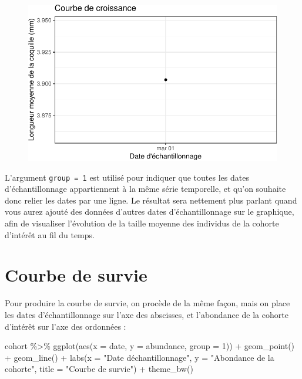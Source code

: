 \documentclass[
  a4paper,
  DIV=11,
  numbers=noendperiod,
  oneside]{scrreprt}
\newenvironment{Shaded}{}{}
\newcommand{\AttributeTok}[1]{\textcolor[rgb]{0.84,0.23,0.29}{#1}}
\newcommand{\DecValTok}[1]{\textcolor[rgb]{0.00,0.36,0.77}{#1}}
\newcommand{\FunctionTok}[1]{\textcolor[rgb]{0.44,0.26,0.76}{#1}}
\newcommand{\NormalTok}[1]{\textcolor[rgb]{0.14,0.16,0.18}{#1}}
\newcommand{\SpecialCharTok}[1]{\textcolor[rgb]{0.00,0.36,0.77}{#1}}
\newcommand{\StringTok}[1]{\textcolor[rgb]{0.01,0.18,0.38}{#1}}
\begin{document}
\begin{figure}


{\centering \includegraphics{04-Cohortes_files/figure-pdf/fig-croiss-1.pdf}

}

\end{figure}

L'argument \texttt{group\ =\ 1} est utilisé pour indiquer que toutes les
dates d'échantillonnage appartiennent à la même série temporelle, et
qu'on souhaite donc relier les dates par une ligne. Le résultat sera
nettement plus parlant quand vous aurez ajouté des données d'autres
dates d'échantillonnage sur le graphique, afin de visualiser l'évolution
de la taille moyenne des individus de la cohorte d'intérêt au fil du
temps.

\hypertarget{courbe-de-survie}{%
\section{Courbe de survie}\label{courbe-de-survie}}

Pour produire la courbe de survie, on procède de la même façon, mais on
place les dates d'échantillonnage sur l'axe des abscisses, et
l'abondance de la cohorte d'intérêt sur l'axe des ordonnées :

\begin{Shaded}
\begin{Highlighting}[]
\NormalTok{cohort }\SpecialCharTok{\%\textgreater{}\%}
  \FunctionTok{ggplot}\NormalTok{(}\FunctionTok{aes}\NormalTok{(}\AttributeTok{x =}\NormalTok{ date, }\AttributeTok{y =}\NormalTok{ abundance, }\AttributeTok{group =} \DecValTok{1}\NormalTok{)) }\SpecialCharTok{+}
  \FunctionTok{geom\_point}\NormalTok{() }\SpecialCharTok{+}
  \FunctionTok{geom\_line}\NormalTok{() }\SpecialCharTok{+}
  \FunctionTok{labs}\NormalTok{(}\AttributeTok{x =} \StringTok{"Date d\textquotesingle{}échantillonnage"}\NormalTok{,}
       \AttributeTok{y =} \StringTok{"Abondance de la cohorte"}\NormalTok{,}
       \AttributeTok{title =} \StringTok{"Courbe de survie"}\NormalTok{) }\SpecialCharTok{+}
  \FunctionTok{theme\_bw}\NormalTok{()}
\end{Highlighting}
\end{Shaded}
\end{document}
